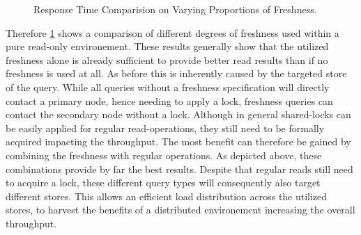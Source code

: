\begin{figure}[t] 
    \centering 
    \caption{Response Time Comparision on Varying Proportions of Freshness.}
    \label{fig:fresh0}
\end{figure}



Therefore \ref{fig:fresh0} shows a comparison of different degrees of freshness used within a pure read-only environement.
These results generally show that the utilized freshness alone is already sufficient to provide better read results than if no freshness is used at all.
As before this is inherently caused by the targeted store of the query. While all queries without a freshness specification will directly contact a primary node,
hence needing to apply a lock, freshness queries can contact the secondary node without a lock. Although in general shared-locks can be easily applied for regular read-operations, they still need to be formally acquired impacting
the throughput. The most benefit can therefore be gained by combining the freshness with regular operations. As depicted above, these combinations provide by far 
the best results. Despite that regular reads still need to acquire a lock, these different query types will consequently also target different stores. 
This allows an efficient load distribution across the utilized stores, to harvest the benefits of a distributed environement increasing the overall throughput.




